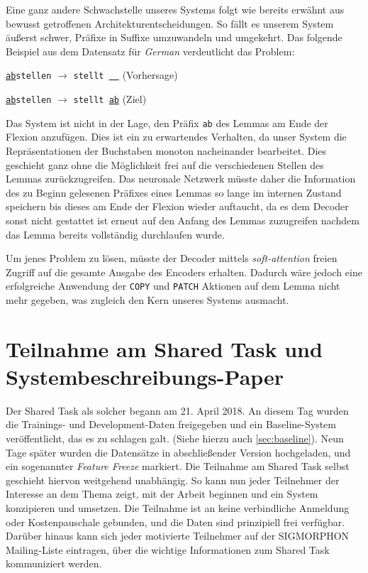 \documentclass[11pt,a4paper]{article}
\newcommand{\lang}[1]{\textit{#1}}
\newcommand{\action}[1]{\texttt{#1}}
\begin{document}
Eine ganz andere Schwachstelle unseres Systems folgt wie bereits erwähnt aus bewusst getroffenen Architekturentscheidungen.
So fällt es unserem System äußerst schwer, Präfixe in Suffixe umzuwandeln und umgekehrt. Das folgende Beispiel aus dem Datensatz für \lang{German} verdeutlicht das Problem:
\begin{compactitem}
	\item \texttt{\underline{ab}stellen} $\to$ \texttt{stellt \underline{\ \ }} (Vorhersage)
    \item \texttt{\underline{ab}stellen} $\to$ \texttt{stellt \underline{ab}} (Ziel)
\end{compactitem}
Das System ist nicht in der Lage, den Präfix \texttt{ab} des Lemmas am Ende der Flexion anzufügen.
Dies ist ein zu erwartendes Verhalten, da unser System die Repräsentationen der Buchstaben monoton nacheinander bearbeitet. Dies geschieht ganz ohne die Möglichkeit frei auf die verschiedenen Stellen des Lemmas zurückzugreifen.
Das neuronale Netzwerk müsste daher die Information des zu Beginn gelesenen Präfixes eines Lemmas so lange im internen Zustand speichern bis dieses am Ende der Flexion wieder auftaucht, da es dem Decoder sonst nicht gestattet ist erneut auf den Anfang des Lemmas zuzugreifen nachdem das Lemma bereits vollständig durchlaufen wurde.

Um jenes Problem zu lösen, müsste der Decoder mittels \textit{soft-attention} freien Zugriff auf die gesamte Ausgabe des Encoders erhalten. Dadurch wäre jedoch eine erfolgreiche Anwendung der \action{COPY} und \action{PATCH} Aktionen auf dem Lemma nicht mehr gegeben, was zugleich den Kern unseres Systems ausmacht.

\section{Teilnahme am Shared Task und Systembeschreibungs-Paper}
\label{sec:paper}

Der Shared Task als solcher begann am 21. April 2018. An diesem Tag wurden die Trainings- und Development-Daten freigegeben und ein Baseline-System veröffentlicht, das es zu schlagen galt. (Siehe hierzu auch \autoref{sec:baseline}). Neun Tage später wurden die Datensätze in abschließender Version hochgeladen, und ein sogenannter \textit{Feature Freeze} markiert.
Die Teilnahme am Shared Task selbst geschieht hiervon weitgehend unabhängig. So kann nun jeder Teilnehmer der Interesse an dem Thema zeigt, mit der Arbeit beginnen und ein System konzipieren und umsetzen. Die Teilnahme ist an keine verbindliche Anmeldung oder Kostenpauschale gebunden, und die Daten sind prinzipiell frei verfügbar. Darüber hinaus kann sich jeder motivierte Teilnehmer auf der SIGMORPHON Mailing-Liste eintragen, über die wichtige Informationen zum Shared Task kommuniziert werden.
\end{document}

